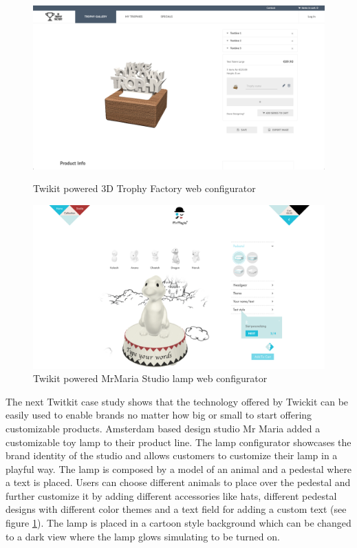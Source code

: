 \documentclass[../medieninformatik-arbeit.tex]{subfiles}
\begin{document}
\begin{figure}[h]
\captionsetup{width=0.4\textwidth}
\centering
\begin{minipage}{.45\textwidth}
\centering
  \includegraphics[width=\linewidth]{RelatedWork/img/trophy-config}
  \caption{\protect Twikit powered 3D Trophy Factory web configurator \cite{trophy2015factory}}
\label{fig:trophy-config}
\end{minipage}
\begin{minipage}{.45\textwidth}
\centering
  \includegraphics[width=\linewidth]{RelatedWork/img/mrmaria-config}
  \caption{\protect Twikit powered MrMaria Studio lamp web configurator \cite{mrmaria2015studio}} 
\label{fig:mmaria-config}
\end{minipage}
\end{figure}

The next Twitkit case study shows that the technology offered by Twickit can be easily used to enable brands no matter how big or small to start offering customizable products. Amsterdam based design studio Mr Maria \cite{mrmaria2015studio} added a customizable toy lamp to their product line. The lamp configurator showcases the brand identity of the studio and allows customers to customize their lamp in a playful way. The lamp is composed by a model of an animal and a pedestal where a text is placed. Users can choose different animals to place over the pedestal and further customize it by adding different accessories like hats, different pedestal designs with different color themes and a text field for adding a custom text (see figure \ref{fig:mmaria-config}). The lamp is placed in a cartoon style background which can be changed to a dark view where the lamp glows simulating to be turned on.  
\end{document}
